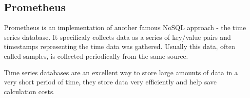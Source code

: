 \subsection{Prometheus}
\label{subsec:background:second_section:thrid_subsection}
\par Prometheus is an implementation of another famous NoSQL approach - the time series database. It specificaly collects data as a series of key/value pairs and timestamps representing the time data was gathered. Usually this data, often called samples, is collected periodically from the same source. 
\par Time series databases are an excellent way to store large amounts of data in a very short period of time, they store data very efficiently and help save calculation costs\citep{PrometheusCloud}.
